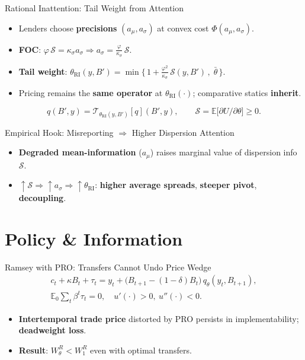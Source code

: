 \documentclass[aspectratio=169,11pt,professionalfonts]{beamer}
\newcommand{\E}{\mathbb{E}}
\newcommand{\1}{\mathbb{1}}
\begin{document}
\begin{frame}{Rational Inattention: Tail Weight from Attention}
  \begin{itemize}
    \item Lenders choose \textbf{precisions} $(a_\mu,a_\sigma)$ at convex cost
          $\Phi(a_\mu,a_\sigma)$.
    \item \textbf{FOC}: $\varphi\,\mathcal S=\kappa_\sigma a_\sigma\Rightarrow a_\sigma=\tfrac{\varphi}{\kappa_\sigma}\,\mathcal S$.
    \item \textbf{Tail weight}: $\displaystyle \theta_{\mathrm{RI}}(y,B')=\min\Big\{\,1+\frac{\varphi^2}{\kappa_\sigma}\,\mathcal S(y,B')\,,\;\bar\theta\,\Big\}$.
    \item Pricing remains the \textbf{same operator} at $\theta_{\mathrm{RI}}(\cdot)$;
          comparative statics \textbf{inherit}.
  \end{itemize}
  \vspace{0.5em}
  \begin{equation*}
    q(B',y)=\mathcal T_{\theta_{\mathrm{RI}}(y,B')}[q](B',y),\qquad \mathcal S=\E\Big[\partial U/\partial\theta\Big]\ge0.
  \end{equation*}
\end{frame}

\begin{frame}{Empirical Hook: Misreporting \texorpdfstring{$\Rightarrow$}{=>} Higher Dispersion Attention}
  \begin{itemize}
    \item \textbf{Degraded mean-information} ($a_\mu$) raises marginal value of dispersion info $\mathcal S$.
    \item $\uparrow\mathcal S\Rightarrow \uparrow a_\sigma\Rightarrow \uparrow \theta_{\mathrm{RI}}$: \textbf{higher average spreads}, \textbf{steeper pivot}, \textbf{decoupling}.
  \end{itemize}
\end{frame}

\section{Policy \& Information}

\begin{frame}{Ramsey with PRO: Transfers Cannot Undo Price Wedge}
  \begin{gather*}
    c_t+\kappa B_t+\tau_t = y_t+\big(B_{t+1}-(1{-}\delta)B_t\big)\,q_\theta(y_t,B_{t+1}),\\
    \E_0\sum_t \beta^t\tau_t=0,\quad u'(\cdot)>0,\ u''(\cdot)<0.
  \end{gather*}
  \begin{itemize}
    \item \textbf{Intertemporal trade price} distorted by PRO persists in implementability; \textbf{deadweight loss}.
    \item \textbf{Result}: $W^R_\theta<W^R_1$ even with optimal transfers.
  \end{itemize}
\end{frame}
\end{document}
